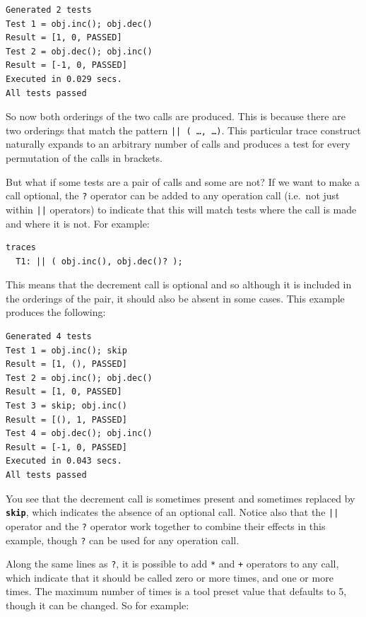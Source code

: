 \documentclass{overturerepchap}
\begin{document}
\small
\lstset{style=tool,language=}
\begin{lstlisting}[escapechar=@]
Generated 2 tests
Test 1 = obj.inc(); obj.dec()
Result = [1, 0, PASSED]
Test 2 = obj.dec(); obj.inc()
Result = [-1, 0, PASSED]
Executed in 0.029 secs. 
All tests passed
\end{lstlisting}
\lstset{style=mystyle}
\lstset{language=VDM++}
\normalsize

So now both orderings of the two calls are produced. This is because there are
two orderings that match the pattern \texttt{|| ( \ldots, \ldots )}. This
particular trace construct naturally expands to an arbitrary number of calls and
produces a test for every permutation of the calls in brackets.

But what if some tests are a pair of calls and some are not? If we want to make
a call optional, the \texttt{?} operator can be added to any operation call
(i.e.\ not just within \texttt{||} operators) to indicate that this will match
tests where the call is made and where it is not. For example:

\small
\begin{lstlisting}
traces
  T1: || ( obj.inc(), obj.dec()? );
\end{lstlisting}
\normalsize

This means that the decrement call is optional and so although it is included in
the orderings of the pair, it should also be absent in some cases. This
example produces the following:

\small
\lstset{style=tool,language=}
\begin{lstlisting}[escapechar=@]
Generated 4 tests
Test 1 = obj.inc(); skip
Result = [1, (), PASSED]
Test 2 = obj.inc(); obj.dec()
Result = [1, 0, PASSED]
Test 3 = skip; obj.inc()
Result = [(), 1, PASSED]
Test 4 = obj.dec(); obj.inc()
Result = [-1, 0, PASSED]
Executed in 0.043 secs. 
All tests passed
\end{lstlisting}
\lstset{style=mystyle}
\lstset{language=VDM++}
\normalsize

You see that the decrement call is sometimes present and sometimes replaced by
\texttt{\textbf{skip}}, which indicates the absence of an optional call. Notice also that
the \texttt{||} operator and the \texttt{?} operator work together to combine their
effects in this example, though \texttt{?} can be used for any operation call.

Along the same lines as \texttt{?}, it is possible to add \texttt{*} and
\texttt{+} operators to any call, which indicate that it should be called zero
or more times, and one or more times. The maximum number of times is a tool preset
value that defaults to 5, though it can be changed. So for example:
\end{document}
